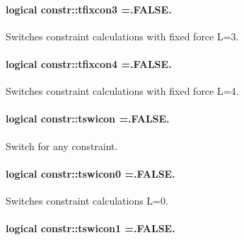 \paragraph[{\texorpdfstring{tfixcon3}{tfixcon3}}]{\setlength{\rightskip}{0pt plus 5cm}logical constr\+::tfixcon3 =.F\+A\+L\+S\+E.}\hypertarget{namespaceconstr_ad17bca6891f805ef6cc0596067dfd473}{}\label{namespaceconstr_ad17bca6891f805ef6cc0596067dfd473}


Switches constraint calculations with fixed force L=3. 

\paragraph[{\texorpdfstring{tfixcon4}{tfixcon4}}]{\setlength{\rightskip}{0pt plus 5cm}logical constr\+::tfixcon4 =.F\+A\+L\+S\+E.}\hypertarget{namespaceconstr_a92c73883617275646fba95ec0731601e}{}\label{namespaceconstr_a92c73883617275646fba95ec0731601e}


Switches constraint calculations with fixed force L=4. 

\paragraph[{\texorpdfstring{tswicon}{tswicon}}]{\setlength{\rightskip}{0pt plus 5cm}logical constr\+::tswicon =.F\+A\+L\+S\+E.}\hypertarget{namespaceconstr_adc54cf7417be68f0c9e76ac4aa3a2785}{}\label{namespaceconstr_adc54cf7417be68f0c9e76ac4aa3a2785}


Switch for any constraint. 

\paragraph[{\texorpdfstring{tswicon0}{tswicon0}}]{\setlength{\rightskip}{0pt plus 5cm}logical constr\+::tswicon0 =.F\+A\+L\+S\+E.}\hypertarget{namespaceconstr_ab201eb89c495c33e406fb3e01120314e}{}\label{namespaceconstr_ab201eb89c495c33e406fb3e01120314e}


Switches constraint calculations L=0. 

\paragraph[{\texorpdfstring{tswicon1}{tswicon1}}]{\setlength{\rightskip}{0pt plus 5cm}logical constr\+::tswicon1 =.F\+A\+L\+S\+E.}\hypertarget{namespaceconstr_a846dedd280a36badad283ce9ad5e8ff0}{}\label{namespaceconstr_a846dedd280a36badad283ce9ad5e8ff0}



